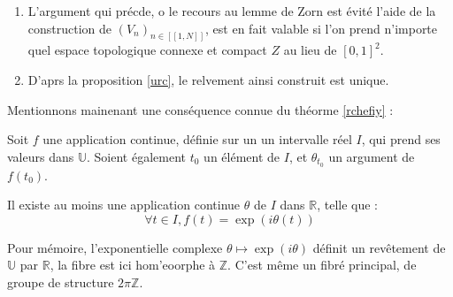 \begin{rema}
\begin{enumerate}
\item L'argument qui pr\'ecde, o le recours au lemme de Zorn est \'evit\'e  l'aide de la construction de $(V_n)_{n\in [\![1,N]\!]}$, %
est en fait valable si l'on prend n'importe quel espace topologique connexe et compact $Z$ au lieu de $[0,1]^2$.
\item D'aprs la proposition \ref{urc}, le relvement ainsi construit est unique.
\end{enumerate}
\end{rema}

\bigskip
Mentionnons mainenant une cons\'equence connue %
du th\'eorme \ref{rchefiy} :

\begin{prop}
Soit $f$ une application continue, d\'efinie sur un un intervalle r\'eel $I$, qui prend ses valeurs dans $\mathbb{U}$. %
Soient \'egalement $t_0$ un \'el\'ement de $I$, et $\theta_{t_0}$ un argument de $f(t_0)$.

\par
Il existe au moins une application continue $\theta$ de $I$ dans $\mathbb{R}$, telle que :
\[\forall t \in I, f(t)=\exp (i\theta (t))\]
\end{prop}

Pour m\'emoire, l'exponentielle complexe $\theta \mapsto \exp (i\theta )$ d\'efinit un rev\^etement de $\mathbb{U}$ par $\mathbb{R}$, %
la fibre est ici hom'eoorphe \`a $\mathbb{Z}$. C'est m\^eme un fibr\'e principal, de groupe de structure $2\pi\mathbb{Z}$.

